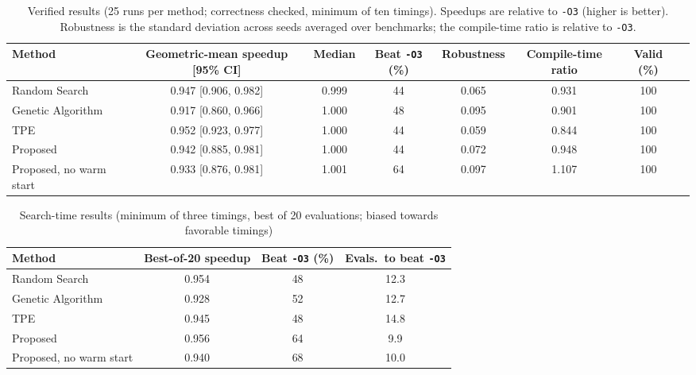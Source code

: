 \begin{table}[t]
\caption{Verified results (25 runs per method; correctness checked, minimum of ten timings). Speedups are relative to \texttt{-O3} (higher is better). Robustness is the standard deviation across seeds averaged over benchmarks; the compile-time ratio is relative to \texttt{-O3}.}
\label{tab:verified}
\centering\small
\begin{tabular}{@{}lccccccc@{}}
\toprule
Method & Geometric-mean speedup [95\% CI] & Median & Beat \texttt{-O3} (\%) & Robustness & Compile-time ratio & Valid (\%)\\
\midrule
Random Search & 0.947 [0.906, 0.982] & 0.999 & 44 & 0.065 & 0.931 & 100\\
Genetic Algorithm & 0.917 [0.860, 0.966] & 1.000 & 48 & 0.095 & 0.901 & 100\\
TPE & 0.952 [0.923, 0.977] & 1.000 & 44 & 0.059 & 0.844 & 100\\
Proposed & 0.942 [0.885, 0.981] & 1.000 & 44 & 0.072 & 0.948 & 100\\
Proposed, no warm start & 0.933 [0.876, 0.981] & 1.001 & 64 & 0.097 & 1.107 & 100\\
\bottomrule
\end{tabular}
\end{table}

\begin{table}[t]
\caption{Search-time results (minimum of three timings, best of 20 evaluations; biased towards favorable timings)}
\label{tab:search}
\centering\footnotesize
\begin{tabular}{@{}lccc@{}}
\toprule
Method & Best-of-20 speedup & Beat \texttt{-O3} (\%) & Evals.\ to beat \texttt{-O3}\\
\midrule
Random Search & 0.954 & 48 & 12.3\\
Genetic Algorithm & 0.928 & 52 & 12.7\\
TPE & 0.945 & 48 & 14.8\\
Proposed & 0.956 & 64 & 9.9\\
Proposed, no warm start & 0.940 & 68 & 10.0\\
\bottomrule
\end{tabular}
\end{table}

